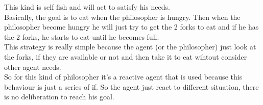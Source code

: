 This kind is self fish and will act to satisfy his needs.\\
Basically, the goal is to eat when the philosopher is hungry. Then when the philosopher become hungry he will just try to get the 2 forks to eat and if he has the 2 forks, he starts to eat until he becomes full.\\
This strategy is really simple because the agent (or the philosopher) just look at the forks, if they are available or not and then take it to eat wihtout consider other agent needs.\\
So for this kind of philosopher it's a reactive agent that is used because this behaviour is just a series of if. So the agent just react to different situation, there is no deliberation to reach his goal.